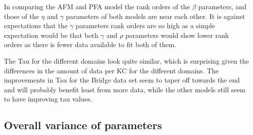 \documentclass{scrartcl}
\begin{document}
In comparing the AFM and PFA model the rank orders of the $\beta$ parameters, and those of the $\eta$ and $\gamma$ parameters of both models are near each other. It is against expectations that the $\gamma$ parameters rank orders are so high as a simple expectation would be that both $\gamma$ and $\rho$ parameters would show lower rank orders as there is fewer data available to fit both of them.
 
The Tau for the different domains look quite similar, which is surprising given the differences in the amount of data per KC for the different domains. The improvements in Tau for the Bridge data set seem to taper off towards the end and will probably benefit least from more data, while the other models still seem to have improving tau values. 
\subsection{Overall variance of parameters}
\label{sec:varresults}
\end{document}

